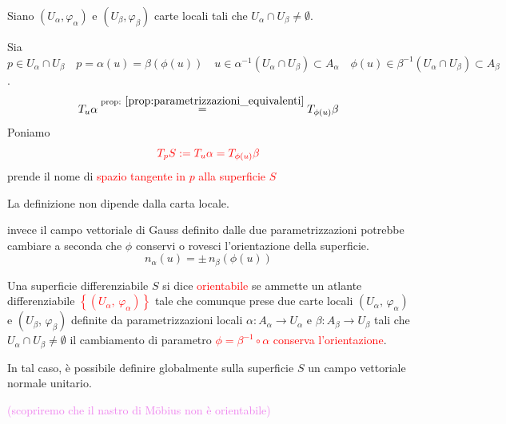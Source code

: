 \begin{center}
        \end{center}
        \begin{osservazione}
        Siano $\left(U_\alpha, \varphi_\alpha\right)$ e $\left(U_\beta, \varphi_\beta\right)$ carte locali tali che $U_\alpha \cap U_\beta \neq \emptyset$.

        Sia $p \in U_\alpha \cap U_\beta \quad p= \alpha(u)= \beta\left(\phi(u)\right) \quad u \in \alpha^{-1}(U_\alpha \cap U_\beta) \subset A_\alpha \quad \phi(u) \in \beta^{-1}(U_\alpha \cap U_\beta) \subset A_\beta$.
        \[ T_u \alpha \overset{\textcolor{black}{ \text{prop: } \ref{prop:parametrizzazioni_equivalenti}}}{=} T_{\phi(u)} \beta  \]
        Poniamo 
        \[ \color{red} T_p S := T_u \alpha = T_{\phi(u)} \beta \]
        prende il nome di \textcolor{red}{spazio tangente in $p$ alla superficie $S$}

        La definizione non dipende dalla carta locale.

        invece il campo vettoriale di Gauss definito dalle due parametrizzazioni potrebbe cambiare a seconda che
        $\phi$ conservi o rovesci l'orientazione della superficie.
        \[ n_\alpha(u) = \pm \, n_\beta(\phi(u)) \]
        \end{osservazione}
        \begin{definizione}
        Una superficie differenziabile $S$ si dice \textcolor{red}{orientabile} se ammette un atlante differenziabile
       \textcolor{red}{ $\left\{\left(U_\alpha, \, \varphi_{\alpha}\right)\right\}$} tale che comunque prese due carte locali
        $\left(U_\alpha, \, \varphi_{\alpha}\right)$ e $\left(U_\beta, \, \varphi_{\beta}\right)$ definite da parametrizzazioni
        locali $\alpha \colon A_\alpha \to U_\alpha$ e $\beta \colon A_\beta \to U_\beta$ tali che $U_\alpha \cap U_\beta \neq \emptyset$ il cambiamento di parametro
        \textcolor{red}{ $\phi = \beta^{-1} \circ \alpha$ conserva l'orientazione}.

        In tal caso, è possibile definire globalmente sulla superficie $S$ un campo vettoriale normale unitario.
        
        \textcolor{violet}{(scopriremo che il nastro di Möbius non è orientabile)}
        \end{definizione}
